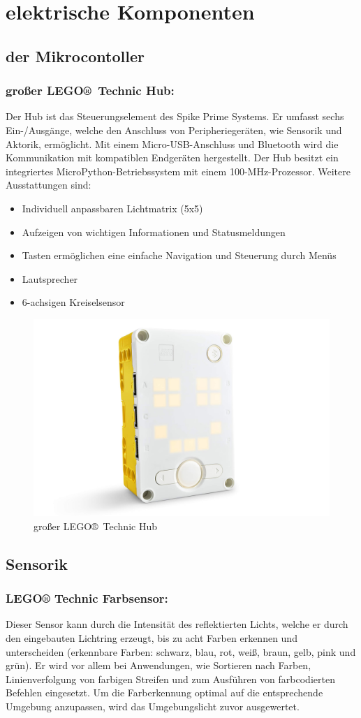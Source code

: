 \chapter{elektrische Komponenten}
\section{der Mikrocontoller}
\subsection*{großer LEGO® Technic Hub:}
Der Hub ist das Steuerungselement des Spike Prime Systems. Er umfasst sechs Ein-/Ausgänge, welche den Anschluss von Peripheriegeräten, wie Sensorik und Aktorik, ermöglicht. Mit einem Micro-USB-Anschluss und Bluetooth wird die Kommunikation mit kompatiblen Endgeräten hergestellt. Der Hub besitzt ein integriertes MicroPython-Betriebssystem mit einem 100-MHz-Prozessor. 
Weitere Ausstattungen sind:
\begin{itemize}
	\item Individuell anpassbaren Lichtmatrix (5x5)
	\item Aufzeigen von wichtigen Informationen und Statusmeldungen
	\item Tasten ermöglichen eine einfache Navigation und Steuerung durch Menüs 
	\item Lautsprecher
	\item 6-achsigen Kreiselsensor
\end{itemize}

\begin{figure}[H]
	\centering
	\includegraphics[width=0.4\linewidth]{images/Hub}
	\caption{großer LEGO® Technic Hub}
	\label{fig:hub}
\end{figure}



\section{Sensorik}
\subsection*{LEGO® Technic Farbsensor:}
Dieser Sensor kann durch die Intensität des reflektierten Lichts, welche er durch den eingebauten Lichtring erzeugt, bis zu acht Farben erkennen und unterscheiden (erkennbare Farben: schwarz, blau, rot, weiß, braun, gelb, pink und grün).  Er wird vor allem bei Anwendungen, wie Sortieren nach Farben, Linienverfolgung von farbigen Streifen und zum Ausführen von farbcodierten Befehlen eingesetzt. Um die Farberkennung optimal auf die entsprechende Umgebung anzupassen, wird das Umgebungslicht zuvor ausgewertet.

